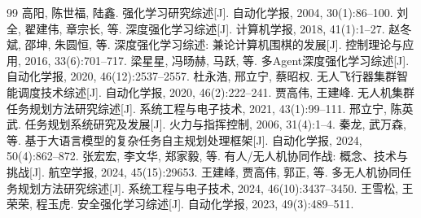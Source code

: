 \documentclass[a4paper,12pt,openany]{ctexbook}
\theoremstyle{definition}
\theoremstyle{plain}
\begin{document}
\begin{thebibliography}{99}
 高阳, 陈世福, 陆鑫. 强化学习研究综述[J]. 自动化学报, 2004, 30(1):86--100.
 刘全, 翟建伟, 章宗长, 等. 深度强化学习综述[J]. 计算机学报, 2018, 41(1):1--27.
 赵冬斌, 邵坤, 朱圆恒, 等. 深度强化学习综述: 兼论计算机围棋的发展[J]. 控制理论与应用, 2016, 33(6):701--717.
 梁星星, 冯旸赫, 马跃, 等. 多Agent深度强化学习综述[J]. 自动化学报, 2020, 46(12):2537--2557.
 杜永浩, 邢立宁, 蔡昭权. 无人飞行器集群智能调度技术综述[J]. 自动化学报, 2020, 46(2):222--241.
 贾高伟, 王建峰. 无人机集群任务规划方法研究综述[J]. 系统工程与电子技术, 2021, 43(1):99--111.
 邢立宁, 陈英武. 任务规划系统研究及发展[J]. 火力与指挥控制, 2006, 31(4):1--4.
 秦龙, 武万森, 等. 基于大语言模型的复杂任务自主规划处理框架[J]. 自动化学报, 2024, 50(4):862--872.
 张宏宏, 李文华, 郑家毅, 等. 有人/无人机协同作战: 概念、技术与挑战[J]. 航空学报, 2024, 45(15):29653.
 王建峰, 贾高伟, 郭正, 等. 多无人机协同任务规划方法研究综述[J]. 系统工程与电子技术, 2024, 46(10):3437--3450.
 王雪松, 王荣荣, 程玉虎. 安全强化学习综述[J]. 自动化学报, 2023, 49(3):489--511.

\end{thebibliography}
\end{document}
